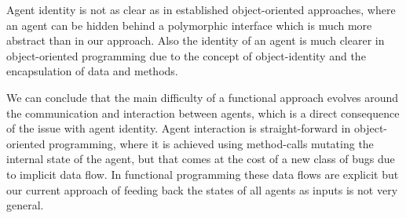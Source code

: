Agent identity is not as clear as in established object-oriented approaches, where an agent can be hidden behind a polymorphic interface which is much more abstract than in our approach. Also the identity of an agent is much clearer in object-oriented programming due to the concept of object-identity and the encapsulation of data and methods.

We can conclude that the main difficulty of a functional approach evolves around the communication and interaction between agents, which is a direct consequence of the issue with agent identity. Agent interaction is straight-forward in object-oriented programming, where it is achieved using method-calls mutating the internal state of the agent, but that comes at the cost of a new class of bugs due to implicit data flow. In functional programming these data flows are explicit but our current approach of feeding back the states of all agents as inputs is not very general.